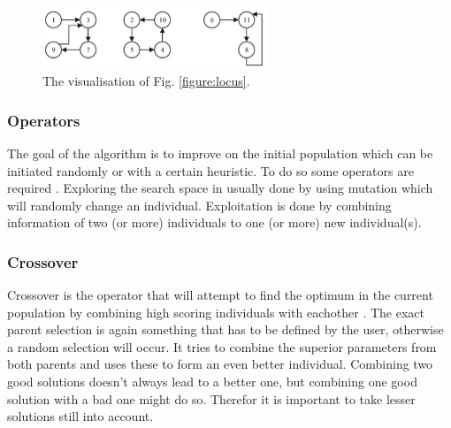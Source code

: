\begin{figure}
\begin{center}
\includegraphics[width=0.6\textwidth]{images/encode.png}
\caption{The visualisation of Fig. \ref{figure:locus}.}\label{figure:encode}
\end{center}
\end{figure}

\subsubsection{Operators}
The goal of the algorithm is to improve on the initial population which can be initiated randomly or with a certain heuristic.
To do so some operators are required \cite{genetics}.
Exploring the search space in usually done by using mutation which will randomly change an individual.
Exploitation is done by combining information of two (or more) individuals to one (or more) new individual(s).
\newpage
\subsubsection*{Crossover}
Crossover is the operator that will attempt to find the optimum in the current population by combining high scoring individuals with eachother \cite{genetics}.
The exact parent selection is again something that has to be defined by the user, otherwise a random selection will occur.
It tries to combine the superior parameters from both parents and uses these to form an even better individual.
Combining two good solutions doesn't always lead to a better one, but combining one good solution with a bad one might do so.
Therefor it is important to take lesser solutions still into account.

